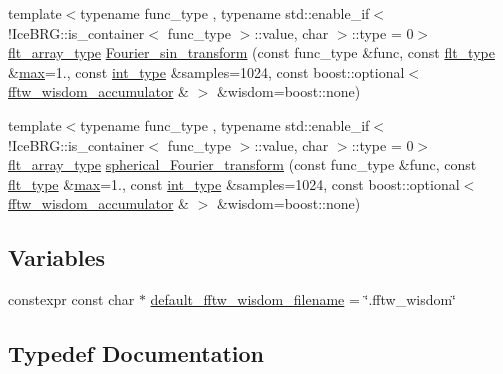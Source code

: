 \begin{DoxyCompactItemize}
{\footnotesize template$<$typename func\+\_\+type , typename std\+::enable\+\_\+if$<$!\+Ice\+B\+R\+G\+::is\+\_\+container$<$ func\+\_\+type $>$\+::value, char $>$\+::type  = 0$>$ }\\\hyperlink{namespaceIceBRG_acdca5c05302480eba6ba053449643a6d}{flt\+\_\+array\+\_\+type} \hyperlink{namespaceIceBRG_1_1Fourier_a1f070994484cad6c11dd8a58871d0b60}{Fourier\+\_\+sin\+\_\+transform} (const func\+\_\+type \&func, const \hyperlink{lib_2IceBRG__main_2common_8h_ad0f130a56eeb944d9ef2692ee881ecc4}{flt\+\_\+type} \&\hyperlink{namespaceIceBRG_af8123f867f9a8c6a9703da8556182c84}{max}=1., const \hyperlink{lib_2IceBRG__main_2common_8h_ac4de9d9335536ac22821171deec8d39e}{int\+\_\+type} \&samples=1024, const boost\+::optional$<$ \hyperlink{classIceBRG_1_1Fourier_1_1fftw__wisdom__accumulator}{fftw\+\_\+wisdom\+\_\+accumulator} \& $>$ \&wisdom=boost\+::none)
\item 
{\footnotesize template$<$typename func\+\_\+type , typename std\+::enable\+\_\+if$<$!\+Ice\+B\+R\+G\+::is\+\_\+container$<$ func\+\_\+type $>$\+::value, char $>$\+::type  = 0$>$ }\\\hyperlink{namespaceIceBRG_acdca5c05302480eba6ba053449643a6d}{flt\+\_\+array\+\_\+type} \hyperlink{namespaceIceBRG_1_1Fourier_a51335fd335a542a763e192bb1f341a83}{spherical\+\_\+\+Fourier\+\_\+transform} (const func\+\_\+type \&func, const \hyperlink{lib_2IceBRG__main_2common_8h_ad0f130a56eeb944d9ef2692ee881ecc4}{flt\+\_\+type} \&\hyperlink{namespaceIceBRG_af8123f867f9a8c6a9703da8556182c84}{max}=1., const \hyperlink{lib_2IceBRG__main_2common_8h_ac4de9d9335536ac22821171deec8d39e}{int\+\_\+type} \&samples=1024, const boost\+::optional$<$ \hyperlink{classIceBRG_1_1Fourier_1_1fftw__wisdom__accumulator}{fftw\+\_\+wisdom\+\_\+accumulator} \& $>$ \&wisdom=boost\+::none)
\end{DoxyCompactItemize}
\subsection*{Variables}
\begin{DoxyCompactItemize}
\item 
constexpr const char $\ast$ \hyperlink{namespaceIceBRG_1_1Fourier_a6ebd3b65a33ddde6362840e1dd67866b}{default\+\_\+fftw\+\_\+wisdom\+\_\+filename} = \char`\"{}.fftw\+\_\+wisdom\char`\"{}
\end{DoxyCompactItemize}


\subsection{Typedef Documentation}
\hypertarget{namespaceIceBRG_1_1Fourier_a647364fe9550c95ba04a10e0228b3c8d}{}
